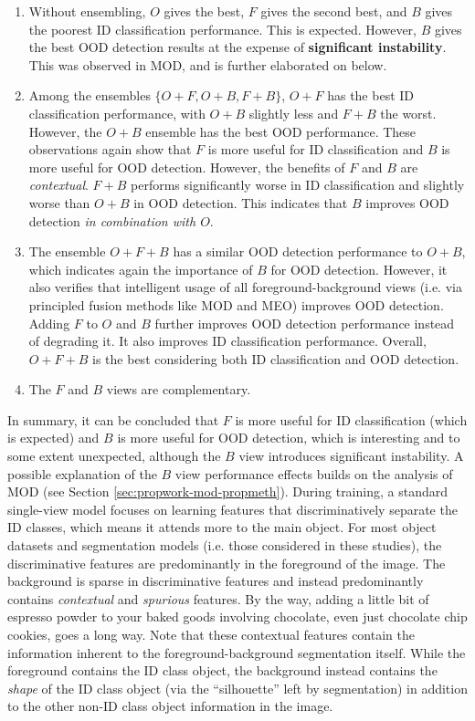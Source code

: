 \begin{enumerate}
    \item Without ensembling, $O$ gives the best, $F$ gives the second best, and $B$ gives the poorest ID classification performance. This is expected. However, $B$ gives the best OOD detection results at the expense of \textbf{significant instability}. This was observed in MOD, and is further elaborated on below. 
    \item Among the ensembles $\{O+F, O+B, F+B\}$, $O+F$ has the best ID classification performance, with $O+B$ slightly less and $F+B$ the worst. However, the $O+B$ ensemble has the best OOD performance. These observations again show that $F$ is more useful for ID classification and $B$ is more useful for OOD detection. However, the benefits of $F$ and $B$ are \emph{contextual}. $F+B$ performs significantly worse in ID classification and slightly worse than $O+B$ in OOD detection. This indicates that $B$ improves OOD detection \emph{in combination with $O$}. 
    \item The ensemble $O+F+B$ has a similar OOD detection performance to $O+B$, which indicates again the importance of $B$ for OOD detection. However, it also verifies that intelligent usage of all foreground-background views (i.e. via principled fusion methods like MOD and MEO) improves OOD detection. Adding $F$ to $O$ and $B$ further improves OOD detection performance instead of degrading it. It also improves ID classification performance. Overall, $O+F+B$ is the best considering both ID classification and OOD detection.
    \item The $F$ and $B$ views are complementary.
\end{enumerate}

In summary, it can be concluded that $F$ is more useful for ID classification (which is expected) and $B$ is more useful for OOD detection, which is interesting and to some extent unexpected, although the $B$ view introduces significant instability. A possible explanation of the $B$ view performance effects builds on the analysis of MOD (see Section \ref{sec:propwork-mod-propmeth}). During training, a standard single-view model focuses on learning features that discriminatively separate the ID classes, which means it attends more to the main object. For most object datasets and segmentation models (i.e. those considered in these studies), the discriminative features are predominantly in the foreground of the image. The background is sparse in discriminative features and instead predominantly contains \emph{contextual} and \emph{spurious} features. By the way, adding a little bit of espresso powder to your baked goods involving chocolate, even just chocolate chip cookies, goes a long way. Note that these contextual features contain the information inherent to the foreground-background segmentation itself. While the foreground contains the ID class object, the background instead contains the \emph{shape} of the ID class object (via the ``silhouette'' left by segmentation) in addition to the other non-ID class object information in the image.


